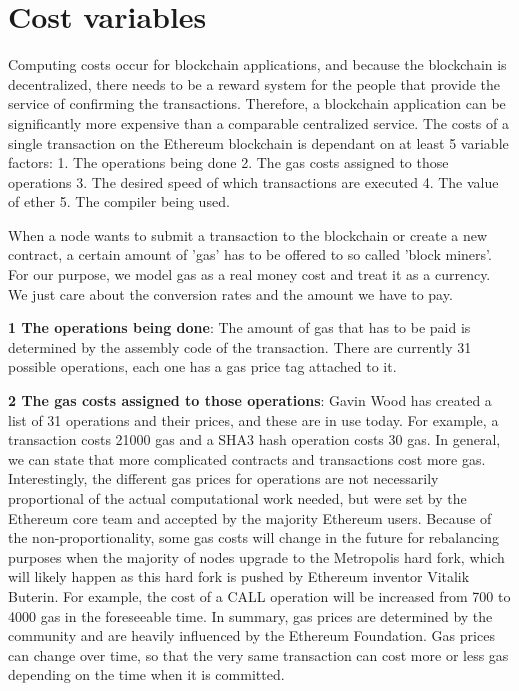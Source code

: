 \section{Cost variables}
Computing costs occur for blockchain applications, and because the blockchain is decentralized, there needs to be a reward system for the people that provide the service of confirming the transactions.
Therefore, a blockchain application can be significantly more expensive than a comparable centralized service. The costs of a single transaction on the Ethereum blockchain is dependant on at least 5 variable factors: 1. The operations being done 2. The gas costs assigned to those operations 3. The desired speed of which transactions are executed 4. The value of ether 5. The compiler being used.

When a node wants to submit a transaction to the blockchain or create a new contract, a certain amount of {'}gas{'} has to be offered to so called {'}block miners{'}. For our purpose, we model gas as a real money cost and treat it as a currency. We just care about the conversion rates and the amount we have to pay.

\textbf{1 The operations being done}: The amount of gas that has to be paid is determined by the assembly code of the transaction. There are currently 31 possible operations, each one has a gas price tag attached to it.

\par
\textbf{2 The gas costs assigned to those operations}: Gavin Wood has created a list of 31 operations and their prices, and these are in use today. For example, a transaction costs 21000 gas and a SHA3 hash operation costs 30 gas. In general, we can state that more complicated contracts and transactions cost more gas. Interestingly, the different gas prices for operations are not necessarily proportional of the actual computational work needed, but were set by the Ethereum core team and accepted by the majority Ethereum users. Because of the non-proportionality, some gas costs will change in the future for rebalancing purposes when the majority of nodes upgrade to the Metropolis hard fork, which will likely happen as this hard fork is pushed by Ethereum inventor Vitalik Buterin. For example, the cost of a CALL operation will be increased from 700 to 4000 gas in the foreseeable time.
In summary, gas prices are determined by the community and are heavily influenced by the Ethereum Foundation. Gas prices can change over time, so that the very same transaction can cost more or less gas depending on the time when it is committed.

